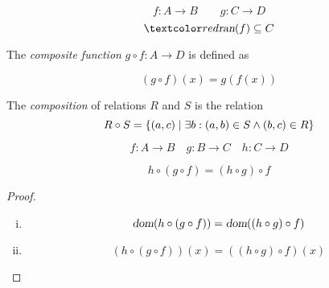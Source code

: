 
\begin{frame}{}
  \begin{center}
  \end{center}

\end{frame}

\begin{frame}{}
  \begin{definition}[Composition]
    \[
      f: A \to B \qquad g: C \to D
    \]
    \[
      \red{\ran{f} \subseteq C}
    \]

    The {\it composite function} $g \circ f: A \to D$ is defined as

    \[
      (g \circ f) (x) = g(f(x))
    \]
  \end{definition}

  \pause
  \vspace{0.50cm}
  \begin{definition}[Composition]
    The {\it composition} of relations $R$ and $S$ is the relation
    \[
      R \circ S = \{(a, c) \mid \exists b: (a, b) \in S \land (b, c) \in R\}
    \]
  \end{definition}
\end{frame}

\begin{frame}{}
  \begin{theorem}
    \[
      f: A \to B \quad g: B \to C \quad h: C \to D
    \]

    \[
      h \circ (g \circ f) = (h \circ g) \circ f
    \]
  \end{theorem}

  \pause
  \vspace{0.60cm}
  \begin{proof}
    \pause
    \begin{enumerate}[(i)]
      \item 
	\[
	  \textsl{dom}(h \circ (g \circ f)) = \textsl{dom}((h \circ g) \circ f)
	\]
      \item 
	\[
	  (h \circ (g \circ f))(x) = ((h \circ g) \circ f)(x)
	\]
    \end{enumerate}
  \end{proof}
\end{frame}

